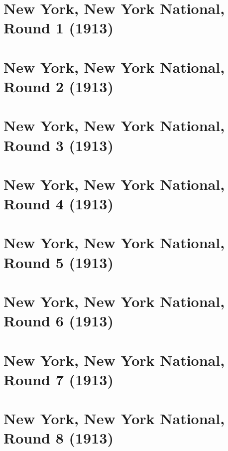\documentclass[11pt]{article}
\begin{document}


\clearpage



\clearpage

\section{New York, New York National, Round 1 (1913)}


\clearpage

\section{New York, New York National, Round 2 (1913)}


\clearpage

\section{New York, New York National, Round 3 (1913)}


\clearpage

\section{New York, New York National, Round 4 (1913)}


\clearpage

\section{New York, New York National, Round 5 (1913)}


\clearpage

\section{New York, New York National, Round 6 (1913)}


\clearpage

\section{New York, New York National, Round 7 (1913)}


\clearpage

\section{New York, New York National, Round 8 (1913)}

\end{document}
